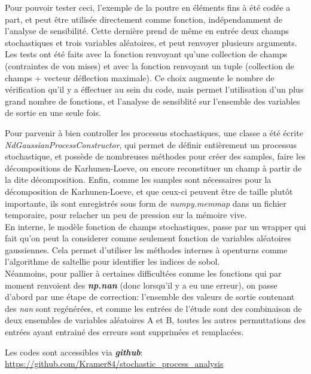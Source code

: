 \documentclass[a4paper,10pt]{article}
\begin{document}
Pour pouvoir tester ceci, l'exemple de la poutre en éléments fins à été codée a part, et peut être utilisée directement comme fonction, indépendamment de l'analyse de sensibilité. Cette dernière prend de même en entrée deux champs stochastiques et trois variables aléatoires, et peut renvoyer plusieurs arguments. Les tests ont été faits avec la fonction renvoyant qu'une collection de champs (contraintes de von mises) et avec la fonction renvoyant un tuple (collection de champs + vecteur déflection maximale). Ce choix augmente le nombre de vérification qu'il y a éffectuer au sein du code, mais permet l'utilisation d'un plus grand nombre de fonctions, et l'analyse de sensiblité sur l'ensemble des variables de sortie en une seule fois.

Pour parvenir à bien controller les processus stochastiques, une classe a été écrite \textit{NdGaussianProcessConstructor}, qui permet de définir entièrement un processus stochastique, et possède de nombreuses méthodes pour créer des samples, faire les décompositions de Karhunen-Loeve, ou encore reconstituer un champ à partir de la dite décomposition. Enfin, comme les samples sont nécessaires pour la décomposition de Karhunen-Loeve, et que ceux-ci peuvent être de taille plutôt importante, ils sont enregistrés sous form de \textit{numpy.memmap} dans un fichier temporaire, pour relacher un peu de pression sur la mémoire vive.\\

En interne, le modèle fonction de champs stochastiques, passe par un wrapper qui fait qu'on peut la considerer comme seulement fonction de variables aléatoires gaussiennes. Cela permet d'utiliser les méthodes internes à openturns comme l'algorithme de saltellie pour identifier les indices de sobol. \\

Néanmoins, pour pallier à certaines difficultées comme les fonctions qui par moment renvoient des \textbf{\textit{np.nan}} (donc lorsqu'il y a eu une erreur), on passe d'abord par une étape de correction:  l'ensemble des valeurs de sortie contenant des \textit{nan} sont regénérées, et comme les entrées de l'étude sont des combinaison de deux ensembles de variables aléatoires A et B, toutes les autres permuttations des entrées ayant entrainé des erreurs sont supprimées et remplacées. \

Les codes sont accessibles via \textit{\textbf{github}}: \\
\url{https://github.com/Kramer84/stochastic_process_analysis}
\end{document}
